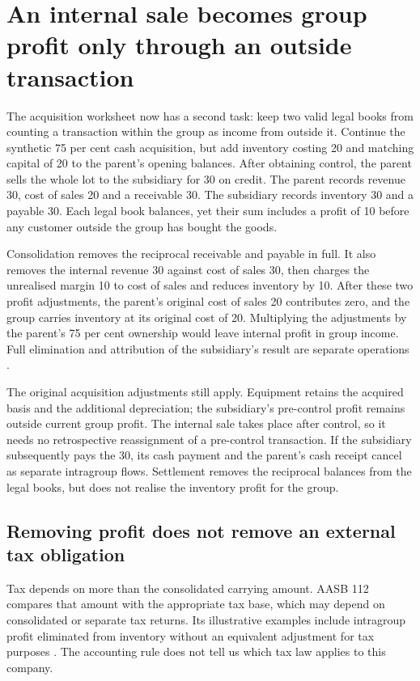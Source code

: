 \section{An internal sale becomes group profit only through an outside transaction}
\label{sec:worked-intragroup}

The acquisition worksheet now has a second task: keep two valid legal books
from counting a transaction within the group as income from outside it. Continue
the synthetic 75 per cent cash acquisition, but add inventory costing 20 and
matching capital of 20 to the parent's opening balances. After obtaining
control, the parent sells the whole lot to the subsidiary for 30 on credit.
The parent records revenue 30, cost of sales 20 and a receivable 30. The
subsidiary records inventory 30 and a payable 30. Each legal book balances,
yet their sum includes a profit of 10 before any customer outside the group
has bought the goods.

Consolidation removes the reciprocal receivable and payable in full. It also
removes the internal revenue 30 against cost of sales 30, then charges the
unrealised margin 10 to cost of sales and reduces inventory by 10. After these
two profit adjustments, the parent's original cost of sales 20 contributes
zero, and the group carries inventory at its original cost of 20. Multiplying
the adjustments by the parent's 75 per cent ownership would leave internal
profit in group income. Full elimination and attribution of the subsidiary's
result are separate operations \citep[paras.~B86--B89]{aasb10control2026}.

The original acquisition adjustments still apply. Equipment retains the
acquired basis and the additional depreciation; the subsidiary's pre-control
profit remains outside current group profit. The internal sale takes place
after control, so it needs no retrospective reassignment of a pre-control
transaction. If the subsidiary subsequently pays the 30, its cash payment and
the parent's cash receipt cancel as separate intragroup flows. Settlement
removes the reciprocal balances from the legal books, but does not realise
the inventory profit for the group.

\subsection{Removing profit does not remove an external tax obligation}

Tax depends on more than the consolidated carrying amount. AASB 112 compares
that amount with the appropriate tax base, which may depend on consolidated
or separate tax returns. Its illustrative examples include intragroup profit
eliminated from inventory without an equivalent adjustment for tax purposes
\citep[para.~11 and illustrative examples, B11]{aasb112dated}. The accounting
rule does not tell us which tax law applies to this company.

